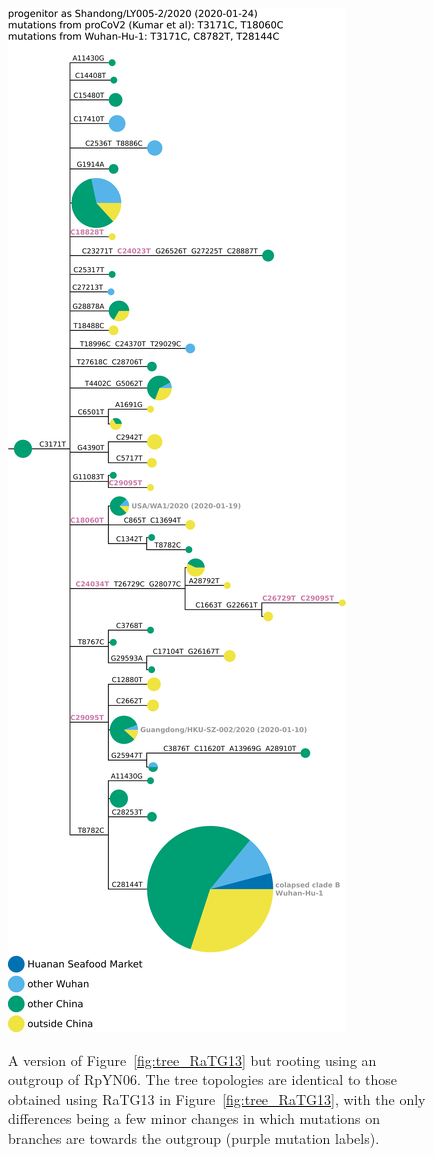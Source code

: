 \documentclass[9pt,twocolumn,twoside]{gsajnl_modified}
\begin{document}
\begin{figure}[h!]
{  \hspace{0.04\linewidth}
 \includegraphics[width=0.31\linewidth, valign=t, clip=true, trim=0in 4.4in 0in 0in]{figures/tree_images/hCoV-19-Shandong-LY005-2-2020_RpYN06_without_deleted_seqs.pdf}
 }
 \caption{
 A version of Figure~\ref{fig:tree_RaTG13} but rooting using an outgroup of RpYN06.
 The tree topologies are identical to those obtained using RaTG13 in Figure~\ref{fig:tree_RaTG13}, with the only differences being a few minor changes in which mutations on branches are towards the outgroup (purple mutation labels).
\label{suppfig:tree_RpYN06}
 }
 \end{figure}
 
\end{document}

